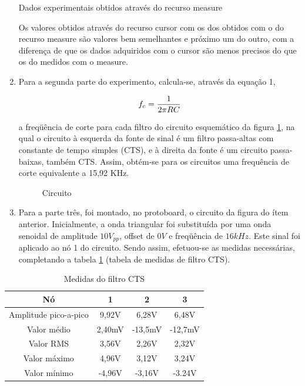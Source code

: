 \documentclass[a4paper]{article} %
\begin{document}
\begin{enumerate}
\begin{table}[h]
\caption{Dados experimentais obtidos através do recurso measure \label{tab:measure}}

\end{table}

Os valores obtidos através do recurso cursor com os dos obtidos com o do recurso measure são valores bem semelhantes e próximo um do outro, com a diferença de que os dados adquiridos com o cursor são menos precisos do que os do medidos com o measure.

\item Para a segunda parte do experimento, calcula-se, através da equação 1,
\vspace{1mm}

\begin{equation}
 f_{c}=\frac{1}{2\pi RC}\\
\end{equation}

\vspace{2mm}


 a freqüência de corte para cada filtro do circuito esquemático da figura \ref{tab:circ}, na qual o circuito à esquerda da fonte de sinal é um filtro passa-altas com constante de tempo simples (CTS), e à direita da fonte é um circuito passa-baixas, também CTS. Assim, obtém-se para os circuitos uma frequência de corte equivalente a 15,92 KHz.


\vspace{3mm}
\begin{figure}[h]
\centerline{}
\caption{Circuito \label{tab:circ}}
\end{figure}

\vspace{2mm}


\item Para a parte três, foi montado, no protoboard, o circuito da figura do ítem anterior. Inicialmente, a onda triangular foi substituída por uma onda senoidal de amplitude $10V_{pp}$, offset de $0V$ e freqüência de $16kHz$. Este sinal foi aplicado ao nó 1 do circuito. Sendo assim, efetuou-se as medidas necessárias, completando a tabela \ref{tab:Medidas-do-filtro} (tabela de medidas de filtro CTS).
\end{enumerate}



%
\begin{table}[h]
\begin{centering}
\begin{tabular}{|c|c|c|c|}
\hline 
Nó & 1 & 2 & 3\tabularnewline
\hline
\hline 
Amplitude pico-a-pico & 9,92V  & 6,28V  & 6,48V \tabularnewline
\hline 
Valor médio & 2,40mV & -13,5mV  & -12,7mV \tabularnewline
\hline 
Valor RMS & 3,56V & 2,26V  & 2,32V \tabularnewline
\hline 
Valor máximo & 4,96V & 3,12V  & 3,24V \tabularnewline
\hline 
Valor mínimo & -4,96V  & -3,16V  & -3.24V \tabularnewline
\hline
\end{tabular}
\par\end{centering}

\caption{Medidas do filtro CTS \label{tab:Medidas-do-filtro}}

\end{table}
\end{document}
